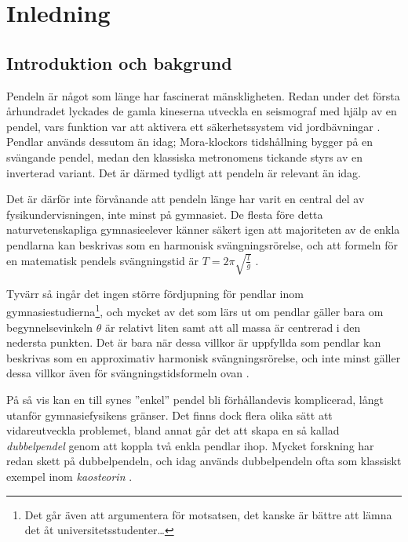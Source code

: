 \setcounter{chapter}{0}
\chapter{Inledning}
\setcounter{page}{1}

\section{Introduktion och bakgrund}
Pendeln är något som länge har fascinerat mänskligheten. Redan under det första århundradet lyckades de gamla kineserna utveckla en seismograf med hjälp av en pendel, vars funktion var att aktivera ett säkerhetssystem vid jordbävningar \cite{book:china_history}. Pendlar används dessutom än idag; Mora-klockors tidshållning bygger på en svängande pendel, medan den klassiska metronomens tickande styrs av en inverterad variant. Det är därmed tydligt att pendeln är relevant än idag.

Det är därför inte förvånande att pendeln länge har varit en central del av fysikundervisningen, inte minst på gymnasiet. De flesta före detta naturvetenskapliga gymnasieelever känner säkert igen att majoriteten av de enkla pendlarna kan beskrivas som en harmonisk svängningsrörelse, och att formeln för en matematisk pendels svängningstid är $T = 2\pi\sqrt{\frac{l}{g}}$ \cite{halliday1997fundamentals}.

Tyvärr så ingår det ingen större fördjupning för pendlar inom gymnasiestudierna\footnote{Det går även att argumentera för motsatsen, det kanske är bättre att lämna det åt universitetsstudenter\dots}, och mycket av det som lärs ut om pendlar gäller bara om begynnelsevinkeln $\theta$ är relativt liten samt att all massa är centrerad i den nedersta punkten. Det är bara när dessa villkor är uppfyllda som pendlar kan beskrivas som en approximativ harmonisk svängningsrörelse, och inte minst gäller dessa villkor även för svängningstidsformeln ovan \cite{halliday1997fundamentals}.

På så vis kan en till synes ''enkel'' pendel bli förhållandevis komplicerad, långt utanför gymnasiefysikens gränser. Det finns dock flera olika sätt att vidareutveckla problemet, bland annat går det att skapa en så kallad \emph{dubbelpendel} genom att koppla två enkla pendlar ihop. Mycket forskning har redan skett på dubbelpendeln, och idag används dubbelpendeln ofta som klassiskt exempel inom \emph{kaosteorin} \cite{britannica_chaos_theory_2025}. 

